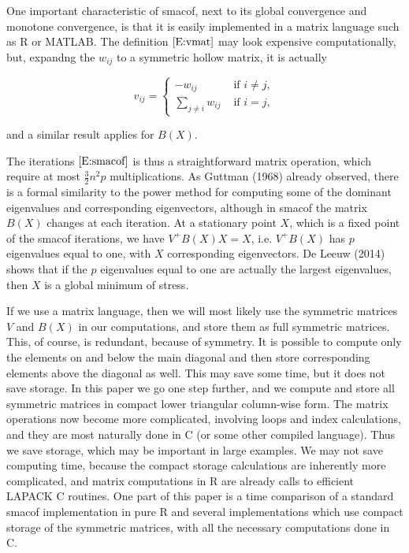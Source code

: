 \documentclass[12pt,]{article}
\begin{document}
One important characteristic of smacof, next to its global convergence
and monotone convergence, is that it is easily implemented in a matrix
language such as R or MATLAB. The definition \(\eqref{E:vmat}\) may look
expensive computationally, but, expandng the \(w_{ij}\) to a symmetric
hollow matrix, it is actually

\begin{equation}\label{E:expand}
v_{ij}=\begin{cases}-w_{ij}&\text{ if }i\not= j,\\\sum_{j\not= i}w_{ij}&\text{ if }i=j,\end{cases}
\end{equation}

and a similar result applies for \(B(X)\).

The iterations \(\eqref{E:smacof}\) is thus a straightforward matrix
operation, which require at most \(\frac32n^2p\) multiplications. As
Guttman (1968) already observed, there is a formal similarity to the
power method for computing some of the dominant eigenvalues and
corresponding eigenvectors, although in smacof the matrix \(B(X)\)
changes at each iteration. At a stationary point \(X\), which is a fixed
point of the smacof iterations, we have \(V^+B(X)X=X\), i.e. \(V^+B(X)\)
has \(p\) eigenvalues equal to one, with \(X\) corresponding
eigenvectors. De Leeuw (2014) shows that if the \(p\) eigenvalues equal
to one are actually the largest eigenvalues, then \(X\) is a global
minimum of stress.

If we use a matrix language, then we will most likely use the symmetric
matrices \(V\) and \(B(X)\) in our computations, and store them as full
symmetric matrices. This, of course, is redundant, because of symmetry.
It is possible to compute only the elements on and below the main
diagonal and then store corresponding elements above the diagonal as
well. This may save some time, but it does not save storage. In this
paper we go one step further, and we compute and store all symmetric
matrices in compact lower triangular column-wise form. The matrix
operations now become more complicated, involving loops and index
calculations, and they are most naturally done in C (or some other
compiled language). Thus we save storage, which may be important in
large examples. We may not save computing time, because the compact
storage calculations are inherently more complicated, and matrix
computations in R are already calls to efficient LAPACK C routines. One
part of this paper is a time comparison of a standard smacof
implementation in pure R and several implementations which use compact
storage of the symmetric matrices, with all the necessary computations
done in C.
\end{document}
